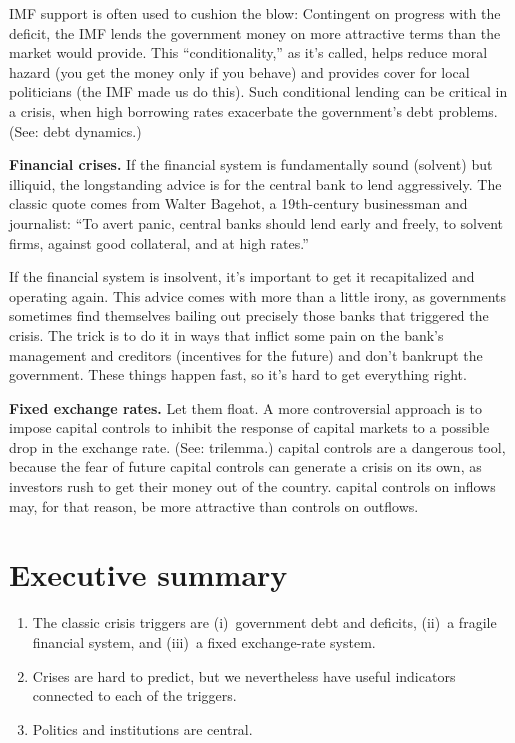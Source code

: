 IMF support is often used to cushion the blow: Contingent on progress with the deficit,
the IMF lends the government money on more attractive terms
than the market would provide.
This ``conditionality,'' as it's called,
helps reduce moral hazard (you get the money only if you behave)
and provides cover for local politicians (the IMF made us do this).
Such conditional lending can be critical in a crisis,
when high borrowing rates exacerbate the government's debt problems.
(See:  debt dynamics.)


\textbf{Financial crises.}
If the financial system is fundamentally sound (solvent) but illiquid,
the longstanding advice is for the central bank  to lend aggressively.
The classic quote comes from Walter Bagehot,
a 19th-century businessman and journalist:
``To avert panic, central banks  should lend early and freely,
to solvent firms, against good collateral, and at high rates.''


If the financial system is insolvent,
it's important to get it recapitalized and operating again.
This advice comes with more than a little irony,
as governments sometimes find themselves bailing out
precisely those banks that triggered the crisis.
The trick is to do it in ways that inflict some pain
on the bank's management and creditors
(incentives for the future) and don't bankrupt the government.
These things happen fast, so it's hard to get everything right.


\textbf{Fixed exchange rates.} Let them float.
A more controversial approach is to impose capital controls   to inhibit the
response of capital markets to a possible drop in the exchange rate.
(See:  trilemma.)
capital controls   are a dangerous tool,
because the fear of future capital controls
can generate a crisis on its own,
as investors rush to get their money out of the country.
capital controls   on inflows may, for that reason, be more attractive
than controls on outflows.


\section*{Executive summary}

\setlength{\leftmargini}{.5\oldleftmargini}
\begin{enumerate}\itemsep=0.0in
\item The classic crisis triggers are
(i)~government debt and deficits,
(ii)~a fragile financial system,
and (iii)~a fixed exchange-rate system.

\item Crises are hard to predict,
but we nevertheless have useful indicators connected to each
of the triggers.

\item Politics and institutions are central. 
\end{enumerate}
\setlength{\leftmargini}{\oldleftmargini}


